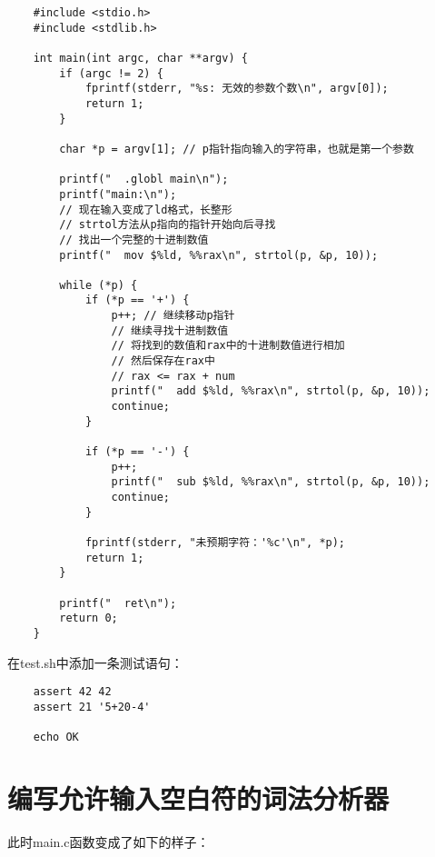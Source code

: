 \documentclass[cn,10pt,math=newtx,citestyle=gb7714-2015,bibstyle=gb7714-2015]{elegantbook}
\begin{document}
\begin{verbatim}
    #include <stdio.h>
    #include <stdlib.h>

    int main(int argc, char **argv) {
        if (argc != 2) {
            fprintf(stderr, "%s: 无效的参数个数\n", argv[0]);
            return 1;
        }

        char *p = argv[1]; // p指针指向输入的字符串，也就是第一个参数

        printf("  .globl main\n");
        printf("main:\n");
        // 现在输入变成了ld格式，长整形
        // strtol方法从p指向的指针开始向后寻找
        // 找出一个完整的十进制数值
        printf("  mov $%ld, %%rax\n", strtol(p, &p, 10));

        while (*p) {
            if (*p == '+') {
                p++; // 继续移动p指针
                // 继续寻找十进制数值
                // 将找到的数值和rax中的十进制数值进行相加
                // 然后保存在rax中
                // rax <= rax + num
                printf("  add $%ld, %%rax\n", strtol(p, &p, 10));
                continue;
            }

            if (*p == '-') {
                p++;
                printf("  sub $%ld, %%rax\n", strtol(p, &p, 10));
                continue;
            }

            fprintf(stderr, "未预期字符：'%c'\n", *p);
            return 1;
        }

        printf("  ret\n");
        return 0;
    }
\end{verbatim}

在test.sh中添加一条测试语句：

\begin{verbatim}
    assert 42 42
    assert 21 '5+20-4'

    echo OK
\end{verbatim}

\chapter{编写允许输入空白符的词法分析器}

此时main.c函数变成了如下的样子：
\end{document}
